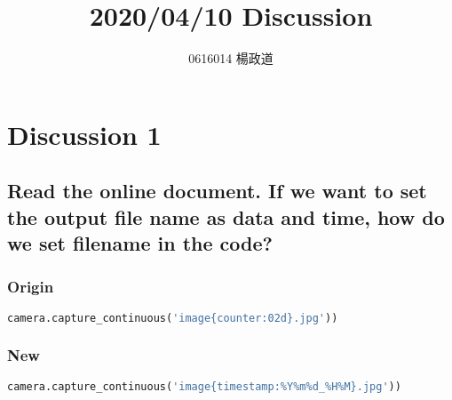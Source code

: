 \title{2020/04/10 Discussion}
\author{0616014 楊政道}
\maketitle
\thispagestyle{fancy}
\section{Discussion 1}
\subsection{Read the online document. If we want to set the output file name as data and time, how do we set filename in the code?}
\subsubsection{Origin}
\begin{lstlisting}[language=Python]
camera.capture_continuous('image{counter:02d}.jpg'))
\end{lstlisting}
\subsubsection{New}
\begin{lstlisting}[language=Python]
camera.capture_continuous('image{timestamp:%Y%m%d_%H%M}.jpg'))
\end{lstlisting}
